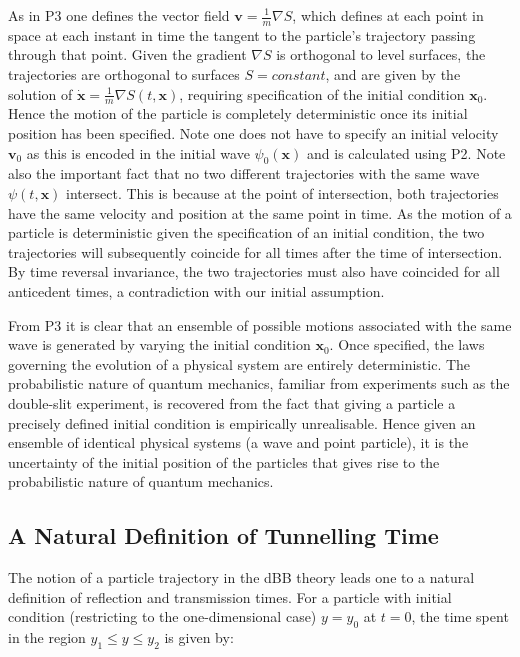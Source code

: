 \documentclass{article}
\begin{document}
\noindent As in P3 one defines the vector field $\boldsymbol{v} = \frac{1}{m}\nabla S$, which defines at each point in space at each instant in time the tangent to the particle's trajectory passing through that point. Given the gradient $\nabla S$ is orthogonal to level surfaces, the trajectories are orthogonal to surfaces $S=constant$, and are given by the solution of $\dot{\boldsymbol{x}}=\frac{1}{m}\nabla S(t,\boldsymbol{x})$, requiring specification of the initial condition $\boldsymbol{x}_0$. Hence the motion of the particle is completely deterministic once its initial position has been specified. Note one does not have to specify an initial velocity $\boldsymbol{v}_0$ as this is encoded in the initial wave $\psi_0(\boldsymbol{x})$ and is calculated using P2. Note also the important fact that no two different trajectories with the same wave $\psi(t,\boldsymbol{x})$ intersect. This is because at the point of intersection, both trajectories have the same velocity and position at the same point in time. As the motion of a particle is deterministic given the specification of an initial condition, the two trajectories will subsequently coincide for all times after the time of intersection. By time reversal invariance, the two trajectories must also have coincided for all anticedent times, a contradiction with our initial assumption.

From P3 it is clear that an ensemble of possible motions associated with the same wave is generated by varying the initial condition $\boldsymbol{x}_0$. Once specified, the laws governing the evolution of a physical system are entirely deterministic. The probabilistic nature of quantum mechanics, familiar from experiments such as the double-slit experiment, is recovered from the fact that giving a particle a precisely defined initial condition is empirically unrealisable. Hence given an ensemble of identical physical systems (a wave and point particle), it is the uncertainty of the initial position of the particles that gives rise to the probabilistic nature of quantum mechanics. 

\subsection{A Natural Definition of Tunnelling Time}
\label{subsection:dBBtime}

The notion of a particle trajectory in the dBB theory leads one to a natural definition of reflection and transmission times. For a particle with initial condition (restricting to the one-dimensional case) $y=y_0$ at $t=0$, the time spent in the region $y_1 \leq y \leq y_2$ is given by:
\end{document}
